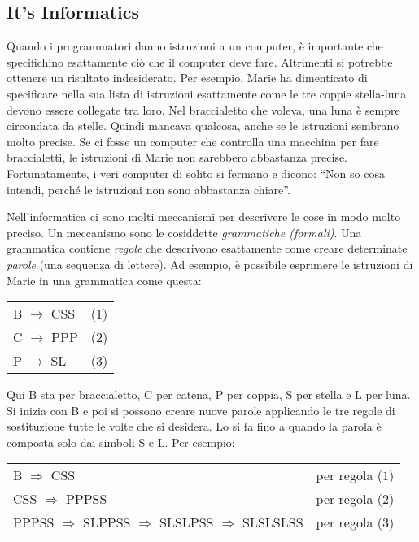 \documentclass[a4paper,11pt]{report}
\makeatletter
\renewenvironment{adjustwidth}[2]{%
    \begin{list}{}{%
    \partopsep\z@%
    \topsep\z@%
    \listparindent\parindent%
    \parsep\parskip%
    \@ifmtarg{#1}{\setlength{\leftmargin}{\z@}}%
                 {\setlength{\leftmargin}{#1}}%
    \@ifmtarg{#2}{\setlength{\rightmargin}{\z@}}%
                 {\setlength{\rightmargin}{#2}}%
    }
    \item[]}{\end{list}}
\makeatother
\begin{document}
\subsection*{It’s Informatics}

Quando i programmatori danno istruzioni a un computer, è importante che specifichino esattamente ciò che il computer deve fare. Altrimenti si potrebbe ottenere un risultato indesiderato. Per esempio, Marie ha dimenticato di specificare nella sua lista di istruzioni esattamente come le tre coppie stella-luna devono essere collegate tra loro. Nel braccialetto che voleva, una luna è sempre circondata da stelle. Quindi mancava qualcosa, anche se le istruzioni sembrano molto precise. Se ci fosse un computer che controlla una macchina per fare braccialetti, le istruzioni di Marie non sarebbero abbastanza precise. Fortunatamente, i veri computer di solito si fermano e dicono: “Non so cosa intendi, perché le istruzioni non sono abbastanza chiare”.

Nell’informatica ci sono molti meccanismi per descrivere le cose in modo molto preciso. Un meccanismo sono le cosiddette \emph{grammatiche (formali)}. Una grammatica contiene \emph{regole} che descrivono esattamente come creare determinate \emph{parole} (una sequenza di lettere). Ad esempio, è possibile esprimere le istruzioni di Marie in una grammatica come questa:

\begin{adjustwidth}{1.5em}{0em}
\begin{tabular}{ @{} l l @{} }
  B \ensuremath{\rightarrow} CSS & ($1$) \\ 
  C \ensuremath{\rightarrow} PPP & ($2$) \\ 
  P \ensuremath{\rightarrow} SL & ($3$)
\end{tabular}


\end{adjustwidth}

Qui B sta per braccialetto, C per catena, P per coppia, S per stella e L per luna. Si inizia con B e poi si possono creare nuove parole applicando le tre regole di sostituzione tutte le volte che si desidera. Lo si fa fino a quando la parola è composta solo dai simboli S e L. Per esempio:

\begin{adjustwidth}{1.5em}{0em}
\begin{tabular}{ @{} l l @{} }
  B \ensuremath{\Rightarrow} CSS & per regola ($1$) \\ 
  CSS \ensuremath{\Rightarrow} PPPSS & per regola ($2$) \\ 
  PPPSS \ensuremath{\Rightarrow} SLPPSS \ensuremath{\Rightarrow} SLSLPSS \ensuremath{\Rightarrow} SLSLSLSS & per regola ($3$)
\end{tabular}


\end{adjustwidth}
\end{document}
